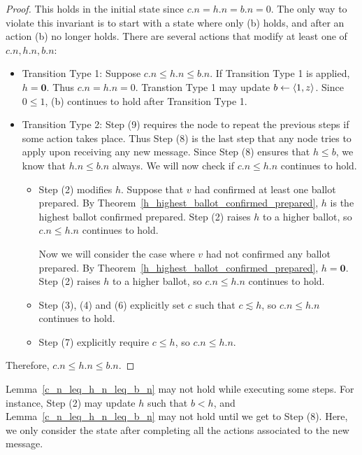 \begin{proof}
    This holds in the initial state since $c.n = h.n = b.n = 0$.
    The only way to violate this invariant is to start with a state where only (b) holds, and after an action (b) no longer holds.
    There are several actions that modify at least one of $c.n, h.n, b.n$:
    \begin{itemize}
        \item
            Transition Type 1:
            Suppose $c.n \leq h.n \leq b.n$.
            If Transition Type 1 is applied, $h = \textbf{0}$.
            Thus $c.n = h.n = 0$.
            Transtion Type 1 may update $b \leftarrow \ev{1, z}$.
            Since $0 \leq 1$, (b) continues to hold after Transition Type 1.
        \item
            Transition Type 2:
            Step (9) requires the node to repeat the previous steps if some action takes place.
            Thus Step (8) is the last step that any node tries to apply upon receiving any new message.
            Since Step (8) ensures that $h \leq b$, we know that $h.n \leq b.n$ always.
            We will now check if $c.n \leq h.n$ continues to hold.
            \begin{itemize}
                \item
                    Step (2) modifies $h$.
                    Suppose that $v$ had confirmed at least one ballot prepared.
                    By Theorem~\ref{h_highest_ballot_confirmed_prepared}, $h$ is the highest ballot confirmed prepared.
                    Step (2) raises $h$ to a higher ballot, so $c.n \leq h.n$ continues to hold.

                    Now we will consider the case where $v$ had not confirmed any ballot prepared.
                    By Theorem~\ref{h_highest_ballot_confirmed_prepared}, $h = \textbf{0}$.
                    Step (2) raises $h$ to a higher ballot, so $c.n \leq h.n$ continues to hold.
                \item
                    Step (3), (4) and (6) explicitly set $c$ such that $c \lesssim h$, so $c.n \leq h.n$ continues to hold.
                \item
                    Step (7) explicitly require $c \leq h$, so $c.n \leq h.n$.
            \end{itemize}
    \end{itemize}
    Therefore, $c.n \leq h.n \leq b.n$.
\end{proof}

\begin{rem}
    Lemma~\ref{c_n_leq_h_n_leq_b_n} may not hold while executing some steps.
    For instance, Step (2) may update $h$ such that $b < h$, and Lemma~\ref{c_n_leq_h_n_leq_b_n} may not hold until we get to Step (8).
    Here, we only consider the state after completing all the actions associated to the new message.
\end{rem}

